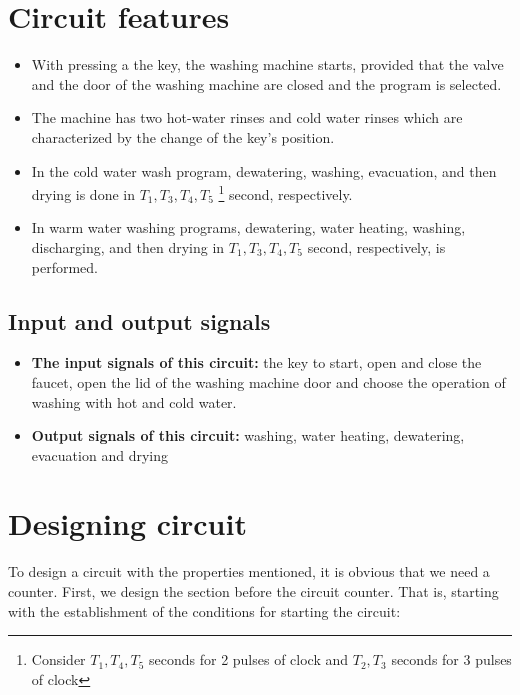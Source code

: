\documentclass[12pt]{article}
\begin{document}
\section{Circuit features}
\label{sec:Circuit features}

\begin{itemize}
  \item  With pressing a the key, the washing machine starts, provided that the valve and the door of the washing machine are closed and the program is selected.
  \item The machine has two hot-water rinses and cold water rinses which are characterized by the change of the key's position.
  \item  In the cold water wash program, dewatering, washing, evacuation, and then drying is done in $ T_1, T_3, T_4, T_5$  \footnote{\label{pulses note} Consider $T_1, T_4, T_5$  seconds for 2 pulses of clock and $T_2, T_3$  seconds for 3 pulses of clock}  second, respectively.
  \item In warm water washing programs, dewatering, water heating, washing, discharging, and then drying in $ T_1, T_3, T_4, T_5 $    second, respectively, is performed.

\end{itemize}

\subsection{Input and output signals}
\begin{itemize}
\item \textbf{The input signals of this circuit:} the key to start, open and close the faucet, open the lid of the washing machine door and choose the operation of washing with hot and cold water.
  \item \textbf{Output signals of this circuit:} washing, water heating, dewatering, evacuation and drying
\end{itemize}

\section{Designing circuit}
\label{sec:Designing circuit
}
To design a circuit with the properties mentioned, it is obvious that we need a counter. First, we design the section before the circuit counter. That is, starting with the establishment of the conditions for starting the circuit:
\end{document}
